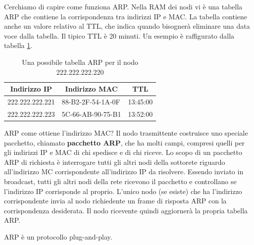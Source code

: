 \documentclass[11pt,a4paper]{book}
\begin{document}
Cerchiamo di capire come funziona ARP. Nella RAM dei nodi vi è una tabella ARP che contiene la corrispondenza tra indirizzi IP e MAC. La tabella contiene anche un valore relativo al TTL, che indica quando bisognerà eliminare una data voce dalla tabella. Il tipico TTL è 20 minuti. Un esempio è raffigurato dalla tabella \ref{tab: 002}.
\begin{center}
	\begin{table}[]
		\begin{tabular}{|l|l|l|}
			\hline
			\multicolumn{1}{|c|}{\textbf{Indirizzo IP}} & \multicolumn{1}{c|}{\textbf{Indirizzo MAC}} & \multicolumn{1}{c|}{\textbf{TTL}} \\ \hline
			222.222.222.221                             & 88-B2-2F-54-1A-0F                           & 13:45:00                          \\ \hline
			222.222.222.223                             & 5C-66-AB-90-75-B1                           & 13:52:00                          \\ \hline
		\end{tabular}
		\caption{Una possibile tabella ARP per il nodo 222.222.222.220}
		\label{tab: 002}
	\end{table}
\end{center}


ARP come ottiene l'indirizzo MAC? Il nodo trasmittente costruisce uno speciale pacchetto, chiamato \textbf{pacchetto ARP}, che ha molti campi, compresi quelli per gli indirizzi IP e MAC di chi spedisce e di chi riceve. Lo scopo di un pacchetto ARP di richiesta è interrogare tutti gli altri nodi della sottorete riguardo all'indirizzo MC corrispondente all'indirizzo IP da risolvere. Essendo inviato in broadcast, tutti gli altri nodi della rete ricevono il pacchetto e controllano se l'indirizzo IP corrisponde al proprio. L'unico nodo (se esiste) che ha l'indirizzo corrispondente invia al nodo richiedente un frame di risposta ARP con la corrispondenza desiderata. Il nodo ricevente quindi aggiornerà la propria tabella ARP.

ARP è un protocollo plug-and-play.
\end{document}
